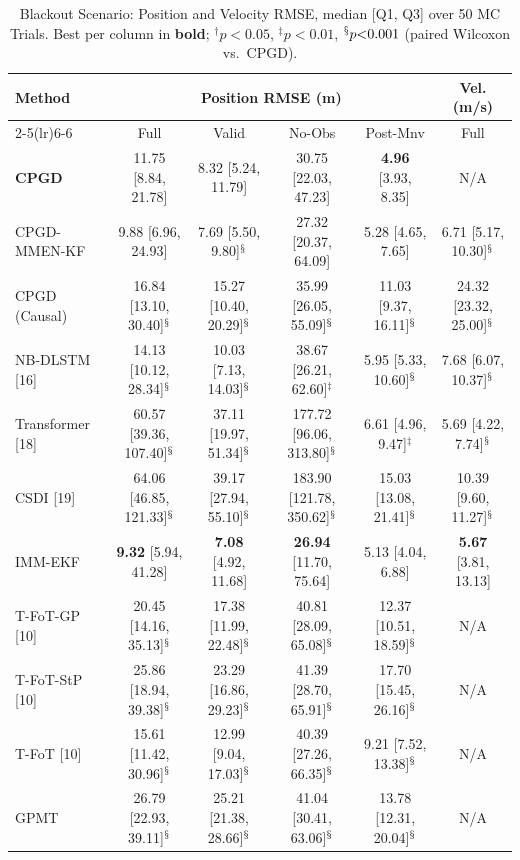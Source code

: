 \begin{table}[htbp]\centering
\caption{Blackout Scenario: Position and Velocity RMSE, median [Q1, Q3] over 50 MC Trials. Best per column in \textbf{bold}; $^{\dagger}p{<}0.05$, $^{\ddagger}p{<}0.01$, $^{\mathsection}p{<}0.001$ (paired Wilcoxon vs.\ CPGD).}
\label{tab:blackout_results}
\setlength{\tabcolsep}{4pt}
\centering\small\begin{tabular}{lccccc}
\toprule
\multirow{2}{*}{Method} & \multicolumn{4}{c}{Position RMSE (m)} & Vel. (m/s) \\
\cmidrule(lr){2-5}\cmidrule(lr){6-6}
& Full & Valid & No-Obs & Post-Mnv & Full \\
\midrule
\textbf{CPGD} & 11.75 [8.84, 21.78] & 8.32 [5.24, 11.79] & 30.75 [22.03, 47.23] & \textbf{4.96} [3.93, 8.35] & N/A \\
CPGD-MMEN-KF & 9.88 [6.96, 24.93] & 7.69 [5.50, 9.80]$^{\mathsection}$ & 27.32 [20.37, 64.09] & 5.28 [4.65, 7.65] & 6.71 [5.17, 10.30]$^{\mathsection}$ \\
CPGD (Causal) & 16.84 [13.10, 30.40]$^{\mathsection}$ & 15.27 [10.40, 20.29]$^{\mathsection}$ & 35.99 [26.05, 55.09]$^{\mathsection}$ & 11.03 [9.37, 16.11]$^{\mathsection}$ & 24.32 [23.32, 25.00]$^{\mathsection}$ \\
NB-DLSTM [16] & 14.13 [10.12, 28.34]$^{\mathsection}$ & 10.03 [7.13, 14.03]$^{\mathsection}$ & 38.67 [26.21, 62.60]$^{\ddagger}$ & 5.95 [5.33, 10.60]$^{\mathsection}$ & 7.68 [6.07, 10.37]$^{\mathsection}$ \\
Transformer [18] & 60.57 [39.36, 107.40]$^{\mathsection}$ & 37.11 [19.97, 51.34]$^{\mathsection}$ & 177.72 [96.06, 313.80]$^{\mathsection}$ & 6.61 [4.96, 9.47]$^{\ddagger}$ & 5.69 [4.22, 7.74]$^{\mathsection}$ \\
CSDI [19] & 64.06 [46.85, 121.33]$^{\mathsection}$ & 39.17 [27.94, 55.10]$^{\mathsection}$ & 183.90 [121.78, 350.62]$^{\mathsection}$ & 15.03 [13.08, 21.41]$^{\mathsection}$ & 10.39 [9.60, 11.27]$^{\mathsection}$ \\
IMM-EKF & \textbf{9.32} [5.94, 41.28] & \textbf{7.08} [4.92, 11.68] & \textbf{26.94} [11.70, 75.64] & 5.13 [4.04, 6.88] & \textbf{5.67} [3.81, 13.13] \\
T-FoT-GP [10] & 20.45 [14.16, 35.13]$^{\mathsection}$ & 17.38 [11.99, 22.48]$^{\mathsection}$ & 40.81 [28.09, 65.08]$^{\mathsection}$ & 12.37 [10.51, 18.59]$^{\mathsection}$ & N/A \\
T-FoT-StP [10] & 25.86 [18.94, 39.38]$^{\mathsection}$ & 23.29 [16.86, 29.23]$^{\mathsection}$ & 41.39 [28.70, 65.91]$^{\mathsection}$ & 17.70 [15.45, 26.16]$^{\mathsection}$ & N/A \\
T-FoT [10] & 15.61 [11.42, 30.96]$^{\mathsection}$ & 12.99 [9.04, 17.03]$^{\mathsection}$ & 40.39 [27.26, 66.35]$^{\mathsection}$ & 9.21 [7.52, 13.38]$^{\mathsection}$ & N/A \\
GPMT & 26.79 [22.93, 39.11]$^{\mathsection}$ & 25.21 [21.38, 28.66]$^{\mathsection}$ & 41.04 [30.41, 63.06]$^{\mathsection}$ & 13.78 [12.31, 20.04]$^{\mathsection}$ & N/A \\
\bottomrule
\end{tabular}
\end{table}
